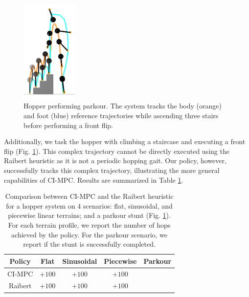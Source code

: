 \begin{figure}[H]
	\begin{center}
		\includegraphics[width=0.25\textwidth]{ci_pc/hopper_parkour_v1.png}
	\end{center}
	\caption[Hopper parkour]{Hopper performing parkour. The system tracks the body (orange) and foot (blue) reference trajectories while ascending three stairs before performing a front flip.}
	\label{cipc_hopper_parkour}
\end{figure}

Additionally, we task the hopper with climbing a staircase and executing a front flip (Fig. \ref{cipc_hopper_parkour}). This complex trajectory cannot be directly executed using the Raibert heuristic as it is not a periodic hopping gait. Our policy, however, successfully tracks this complex trajectory, illustrating the more general capabilities of CI-MPC. Results are summarized in Table \ref{cipc_hopper_results}.  

\begin{table}[H]
	\centering
	\caption[Comparison between CI-MPC and Raibert-heuristic policies for hopper locomotion and parkour]{Comparison between CI-MPC and the Raibert heuristic for a hopper system on 4 scenarios: flat, sinusoidal, and piecewise linear terrains; and a parkour stunt (Fig. \ref{cipc_hopper_parkour}). For each terrain profile, we report the number of hops achieved by the policy. For the parkour scenario, we report if the stunt is successfully completed.}
	
	\begin{tabular}{c c c c c}
		\toprule
		\textbf{Policy} &
		\textbf{Flat} &
		\textbf{Sinusoidal} &
		\textbf{Piecewise} &
		\textbf{Parkour}\\
		\toprule
		CI-MPC & $+100$ & $+100$ & $+100$ & \checkmark \\ 
		Raibert & $+100$ & $+100$ & $+100$ & \ding{53} \\ 
		\toprule
	\end{tabular}
	\label{cipc_hopper_results}
\end{table}

